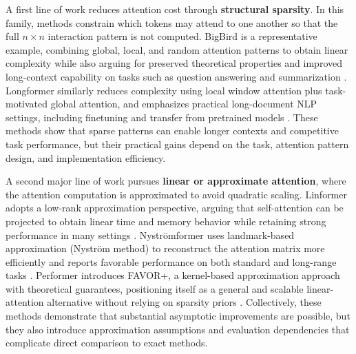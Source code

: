\documentclass[12pt, a4paper]{article}
\begin{document}
A first line of work reduces attention cost through \textbf{structural sparsity}. In this family, methods constrain which tokens may attend to one another so that the full $n \times n$ interaction pattern is not computed. BigBird is a representative example, combining global, local, and random attention patterns to obtain linear complexity while also arguing for preserved theoretical properties and improved long-context capability on tasks such as question answering and summarization \parencite{zaheer2021bigbirdtransformerslonger}. Longformer similarly reduces complexity using local window attention plus task-motivated global attention, and emphasizes practical long-document NLP settings, including finetuning and transfer from pretrained models \parencite{beltagy2020longformerlongdocumenttransformer}. These methods show that sparse patterns can enable longer contexts and competitive task performance, but their practical gains depend on the task, attention pattern design, and implementation efficiency.

A second major line of work pursues \textbf{linear or approximate attention}, where the attention computation is approximated to avoid quadratic scaling. Linformer adopts a low-rank approximation perspective, arguing that self-attention can be projected to obtain linear time and memory behavior while retaining strong performance in many settings \parencite{wang2020linformerselfattentionlinearcomplexity}. Nystr\"{o}mformer uses landmark-based approximation (Nystr\"{o}m method) to reconstruct the attention matrix more efficiently and reports favorable performance on both standard and long-range tasks \parencite{xiong2021nystromformernystrombasedalgorithmapproximating}. Performer introduces FAVOR+, a kernel-based approximation approach with theoretical guarantees, positioning itself as a general and scalable linear-attention alternative without relying on sparsity priors \parencite{choromanski2022rethinkingattentionperformers}. Collectively, these methods demonstrate that substantial asymptotic improvements are possible, but they also introduce approximation assumptions and evaluation dependencies that complicate direct comparison to exact methods.
\end{document}
